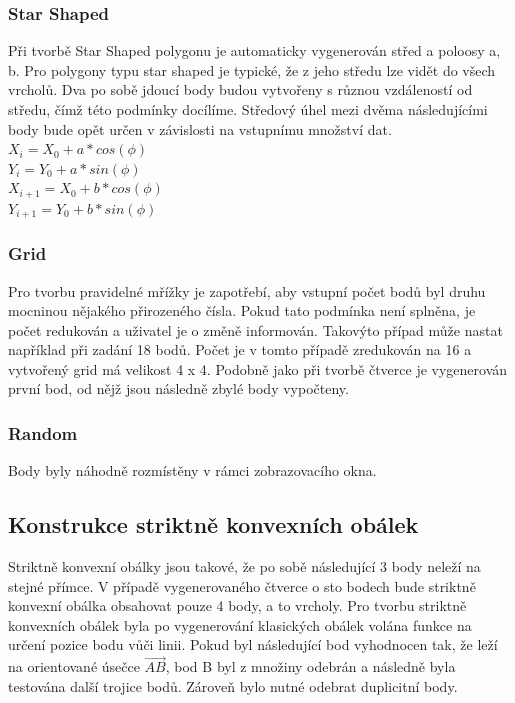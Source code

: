 \documentclass[a4paper, 12pt]{article}
\begin{document}
\subsubsection{Star Shaped}
Při tvorbě Star Shaped polygonu je automaticky vygenerován střed a poloosy a, b. Pro polygony typu star shaped je typické, že z jeho středu lze vidět do všech vrcholů. Dva po sobě jdoucí body budou vytvořeny s různou vzdáleností od středu, čímž této podmínky docílíme. Středový úhel mezi dvěma následujícími body bude opět určen v závislosti na vstupnímu množství dat.\\
$ X_i = X_0 + a * cos(\phi)$ \\
$ Y_i = Y_0 + a * sin(\phi) $ \\
$ X_{i+1} = X_0 + b * cos(\phi)$ \\
$ Y_{i+1} = Y_0 + b * sin(\phi) $

\subsubsection{Grid}
Pro tvorbu pravidelné mřížky je zapotřebí, aby vstupní počet bodů byl druhu mocninou nějakého přirozeného čísla. Pokud tato podmínka není splněna, je počet redukován a uživatel je o změně informován. Takovýto případ může nastat například při zadání 18 bodů. Počet je v tomto případě zredukován na 16 a vytvořený grid má velikost 4 x 4. Podobně jako při tvorbě čtverce je vygenerován první bod, od nějž jsou následně zbylé body vypočteny.

\subsubsection{Random}
Body byly náhodně rozmístěny v rámci zobrazovacího okna.

\subsection{Konstrukce striktně konvexních obálek}
Striktně konvexní obálky jsou takové, že po sobě následující 3 body neleží na stejné přímce. V případě vygenerovaného čtverce o sto bodech bude striktně konvexní obálka obsahovat pouze 4 body, a to vrcholy. Pro tvorbu striktně konvexních obálek byla po vygenerování klasických obálek volána funkce na určení pozice bodu vůči linii. Pokud byl následující bod vyhodnocen tak, že leží na orientované úsečce $\overrightarrow{AB}$, bod B byl z množiny odebrán a následně byla testována další trojice bodů. Zároveň bylo nutné odebrat duplicitní body.
\end{document}
